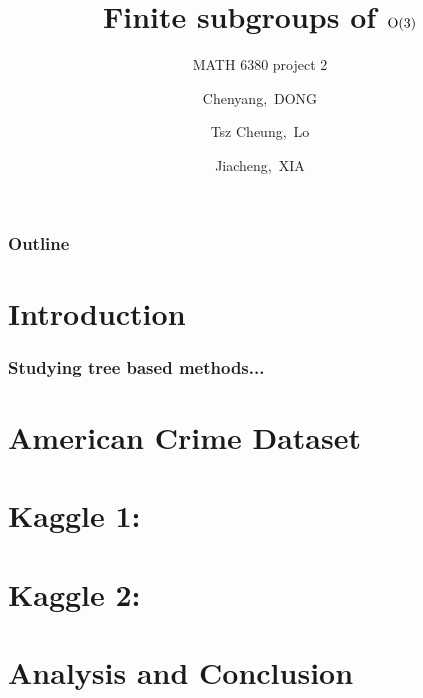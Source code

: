 \documentclass{beamer}
\title[MATH 6380 Project 2]{Finite subgroups of $\textup{O}(3)$}
\subtitle{MATH 6380 project 2}
\author[C.Dong, T.C.LO, J.Xia]
{Chenyang,~DONG \and Tsz Cheung,~Lo \and Jiacheng,~XIA}
\begin{document}
\frame{\titlepage}

\begin{frame}
\frametitle{Outline}
\tableofcontents
\end{frame}

\section{Introduction}
\begin{frame}
\frametitle{Studying tree based methods...}
\end{frame}

\section{American Crime Dataset}
\section{Kaggle 1: }
\section{Kaggle 2: }
\section{Analysis and Conclusion}
\end{document}
